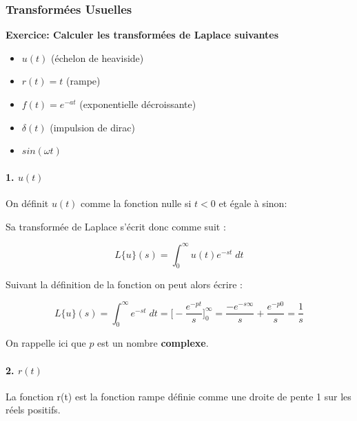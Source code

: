 \documentclass[11pt,a4paper]{article}
\begin{document}
\subsubsection{Transformées Usuelles}
\textbf{Exercice: Calculer les transformées de Laplace suivantes}\\

\begin{itemize}
\item $u(t)$ (échelon de heaviside)
\item $r(t) = t$ (rampe)
\item $f(t) = e^{-at}$ (exponentielle décroissante)
\item $\delta (t)$ (impulsion de dirac) 
\item $sin(\omega t)$
\end{itemize}



\paragraph{\textbf{1.} $u (t)$}
On définit $u(t)$ comme la fonction nulle si $t < 0$ et égale à sinon:

\begin{center}
\end{center}

Sa transformée de Laplace s'écrit donc comme suit :

\[L\{u\}(s) = \int^{\infty}_{0} u(t) e^{-st} \; dt\] 

Suivant la définition de la fonction on peut alors écrire : 

\[L\{u\}(s) = \int^{\infty}_{0} e^{-st} \; dt =  \Big[-\frac{e^{-pt}}{s}\Big]^{\infty}_{0} = \frac{-e^{-s \infty}}{s} + \frac{e^{-p 0}}{s} = \frac{1}{s}  \] 

On rappelle ici que $p$ est un nombre \textbf{complexe}.

\paragraph{\textbf{2.} $r(t)$}
La fonction r(t) est la fonction rampe définie comme une droite de pente 1 sur les réels positifs.
\end{document}
